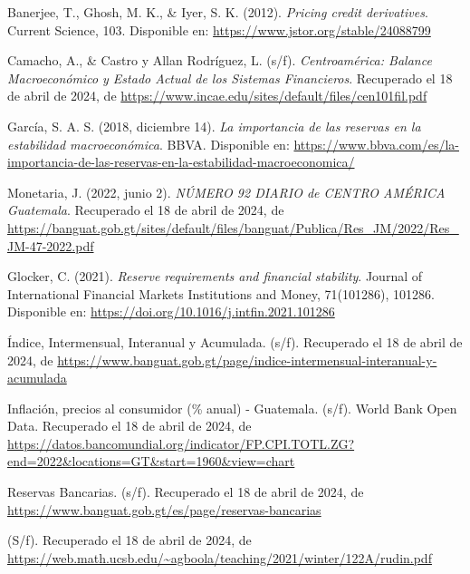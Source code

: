 \begin{thebibliography}{9}

Banerjee, T., Ghosh, M. K., \& Iyer, S. K. (2012). 
\textit{Pricing credit derivatives}. 
Current Science, 103. 
Disponible en: \url{https://www.jstor.org/stable/24088799}

Camacho, A., \& Castro y Allan Rodríguez, L. (s/f). 
\textit{Centroamérica: Balance Macroeconómico y Estado Actual de los Sistemas Financieros}. 
Recuperado el 18 de abril de 2024, de \url{https://www.incae.edu/sites/default/files/cen101fil.pdf}

García, S. A. S. (2018, diciembre 14). 
\textit{La importancia de las reservas en la estabilidad macroeconómica}. 
BBVA. Disponible en: \url{https://www.bbva.com/es/la-importancia-de-las-reservas-en-la-estabilidad-macroeconomica/}

Monetaria, J. (2022, junio 2). 
\textit{NÚMERO 92 DIARIO de CENTRO AMÉRICA Guatemala}. 
Recuperado el 18 de abril de 2024, de \url{https://banguat.gob.gt/sites/default/files/banguat/Publica/Res_JM/2022/Res_JM-47-2022.pdf}

Glocker, C. (2021). 
\textit{Reserve requirements and financial stability}. 
Journal of International Financial Markets Institutions and Money, 71(101286), 101286. 
Disponible en: \url{https://doi.org/10.1016/j.intfin.2021.101286}

Índice, Intermensual, Interanual y Acumulada. (s/f). 
Recuperado el 18 de abril de 2024, de \url{https://www.banguat.gob.gt/page/indice-intermensual-interanual-y-acumulada}

Inflación, precios al consumidor (\% anual) - Guatemala. (s/f). 
World Bank Open Data. 
Recuperado el 18 de abril de 2024, de \url{https://datos.bancomundial.org/indicator/FP.CPI.TOTL.ZG?end=2022&locations=GT&start=1960&view=chart}

Reservas Bancarias. (s/f). 
Recuperado el 18 de abril de 2024, de \url{https://www.banguat.gob.gt/es/page/reservas-bancarias}

(S/f). 
Recuperado el 18 de abril de 2024, de \url{https://web.math.ucsb.edu/~agboola/teaching/2021/winter/122A/rudin.pdf}

\end{thebibliography}
